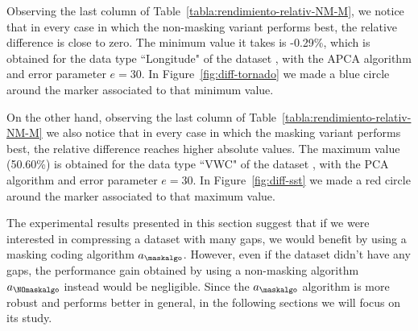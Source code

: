 Observing the last column of Table~\ref{tabla:rendimiento-relativ-NM-M}, we notice that in every case in which the non-masking variant performs best, the relative difference is close to zero. The minimum value it takes is -0.29\%, which is obtained for the data type ``Longitude" of the dataset \datasettornado, with the APCA algorithm and error parameter $e=30$. In Figure~\ref{fig:diff-tornado} we made a blue circle around the marker associated to that minimum value.


On the other hand, observing the last column of Table~\ref{tabla:rendimiento-relativ-NM-M} we also notice that in every case in which the masking variant performs best, the relative difference reaches higher absolute values. The maximum value (50.60\%) is obtained for the data type ``VWC" of the dataset \datasetsst, with the PCA algorithm and error parameter $e=30$. In Figure~\ref{fig:diff-sst} we made a red circle around the marker associated to that maximum value.


The experimental results presented in this section suggest that if we were interested in compressing a dataset with many gaps, we would benefit by using a masking coding algorithm $a_\maskalgo$. However, even if the dataset didn't have any gaps, the performance gain obtained by using a non-masking algorithm $a_\NOmaskalgo$ instead would be negligible. Since the $a_\maskalgo$ algorithm is more robust and performs better in general, in the following sections we will focus on its study.
